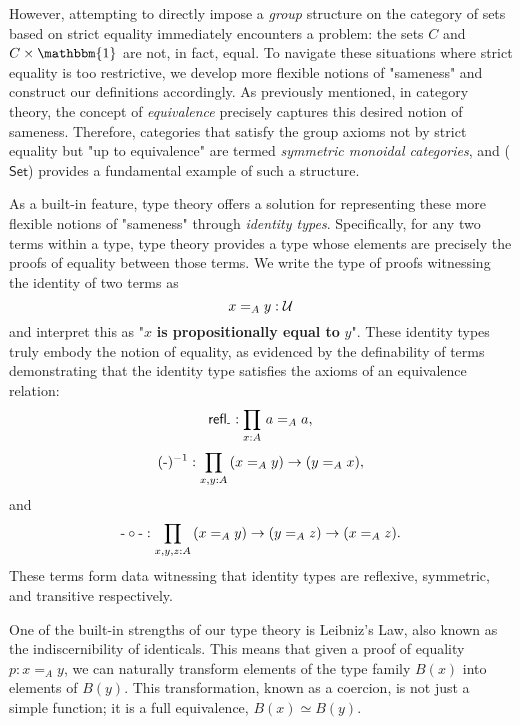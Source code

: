 \documentclass[main.tex]{subfiles}
\begin{document}
However, attempting to directly impose a \textit{group} structure on the category of sets based on strict equality immediately encounters a problem: the sets $C$ and $C \times \mathbbm{1}$ are not, in fact, equal. To navigate these situations where strict equality is too restrictive, we develop more flexible notions of "sameness" and construct our definitions accordingly. As previously mentioned, in category theory, the concept of \textit{equivalence} precisely captures this desired notion of sameness. Therefore, categories that satisfy the group axioms not by strict equality but "up to equivalence" are termed \textit{symmetric monoidal categories}, and ($\mathsf{Set}$) provides a fundamental example of such a structure.

As a built-in feature, type theory offers a solution for representing these more flexible notions of "sameness" through \textit{identity types}. Specifically, for any two terms within a type, type theory provides a type whose elements are precisely the proofs of equality between those terms. We write the type of proofs witnessing the identity of two terms as \[x=_A y : \mathcal{U}\] and interpret this as "$x$ \textbf{is propositionally equal to} $y$". These identity types truly embody the notion of equality, as evidenced by the definability of terms demonstrating that the identity type satisfies the axioms of an equivalence relation:
 $$\refl{\text-} : \prd{x:A}a=_A a,$$
 $$(\text-)^{-1}:\prd{x,y:A}(x =_A y ) \to (y =_A x),$$ and
 $$\text-\circ\text- : \prd{x,y,z : A} (x =_A y) \to (y =_A z) \to (x =_A z).$$
These terms form data witnessing that identity types are reflexive, symmetric, and transitive respectively.

One of the built-in strengths of our type theory is Leibniz's Law, also known as the indiscernibility of identicals. This means that given a proof of equality $p : x =_A y$, we can naturally transform elements of the type family $B(x)$ into elements of $B(y)$. This transformation, known as a coercion, is not just a simple function; it is a full equivalence, $B(x) \simeq B(y)$.
\end{document}
